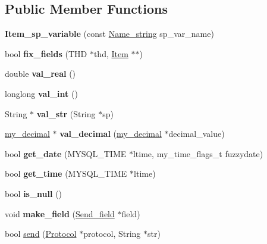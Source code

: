 \subsection*{Public Member Functions}
\begin{DoxyCompactItemize}
\item 
\mbox{\label{classItem__sp__variable_a1404e0edf3dd909944986be311872317}} 
{\bfseries Item\+\_\+sp\+\_\+variable} (const \mbox{\hyperlink{className__string}{Name\+\_\+string}} sp\+\_\+var\+\_\+name)
\item 
\mbox{\label{classItem__sp__variable_a5f8a180607cd3c65d9c91cbdf7956c35}} 
bool {\bfseries fix\+\_\+fields} (T\+HD $\ast$thd, \mbox{\hyperlink{classItem}{Item}} $\ast$$\ast$)
\item 
\mbox{\label{classItem__sp__variable_a156675ed8cef4137c2201154932968f3}} 
double {\bfseries val\+\_\+real} ()
\item 
\mbox{\label{classItem__sp__variable_a90f6653b282d5e824dd0f55ff852dd91}} 
longlong {\bfseries val\+\_\+int} ()
\item 
\mbox{\label{classItem__sp__variable_a772d2982c2c04841a79112cd127e17b1}} 
String $\ast$ {\bfseries val\+\_\+str} (String $\ast$sp)
\item 
\mbox{\label{classItem__sp__variable_a5a5d8503aca8519ad4a24a268a8cab87}} 
\mbox{\hyperlink{classmy__decimal}{my\+\_\+decimal}} $\ast$ {\bfseries val\+\_\+decimal} (\mbox{\hyperlink{classmy__decimal}{my\+\_\+decimal}} $\ast$decimal\+\_\+value)
\item 
\mbox{\label{classItem__sp__variable_a78f66e6c030487eae87a8dd8ba395e93}} 
bool {\bfseries get\+\_\+date} (M\+Y\+S\+Q\+L\+\_\+\+T\+I\+ME $\ast$ltime, my\+\_\+time\+\_\+flags\+\_\+t fuzzydate)
\item 
\mbox{\label{classItem__sp__variable_a10bad79a4a8b7336699096552c6fff99}} 
bool {\bfseries get\+\_\+time} (M\+Y\+S\+Q\+L\+\_\+\+T\+I\+ME $\ast$ltime)
\item 
\mbox{\label{classItem__sp__variable_ab8e8464c5bf97822e8da66bbf15d245f}} 
bool {\bfseries is\+\_\+null} ()
\item 
\mbox{\label{classItem__sp__variable_ae3b9e0332e08fcac48425b7c715d579a}} 
void {\bfseries make\+\_\+field} (\mbox{\hyperlink{classSend__field}{Send\+\_\+field}} $\ast$field)
\item 
bool \mbox{\hyperlink{classItem__sp__variable_a0995ce9203747eca85eff9aca948e131}{send}} (\mbox{\hyperlink{classProtocol}{Protocol}} $\ast$protocol, String $\ast$str)
\end{DoxyCompactItemize}
